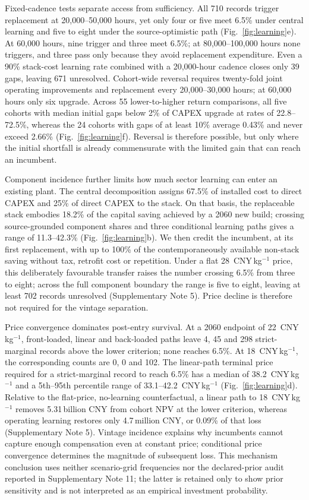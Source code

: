 \documentclass[11pt,a4paper]{article}
\newcommand{\cnykg}{CNY\,kg$^{-1}$}
\begin{document}
Fixed-cadence tests separate access from sufficiency. All 710 records trigger replacement at 20,000--50,000 hours, yet only four or five meet 6.5\% under central learning and five to eight under the source-optimistic path (Fig.~\ref{fig:learning}e). At 60,000 hours, nine trigger and three meet 6.5\%; at 80,000--100,000 hours none triggers, and three pass only because they avoid replacement expenditure. Even a 90\% stack-cost learning rate combined with a 20,000-hour cadence closes only 39 gaps, leaving 671 unresolved. Cohort-wide reversal requires twenty-fold joint operating improvements and replacement every 20,000--30,000 hours; at 60,000 hours only six upgrade. Across 55 lower-to-higher return comparisons, all five cohorts with median initial gaps below 2\% of CAPEX upgrade at rates of 22.8--72.5\%, whereas the 24 cohorts with gaps of at least 10\% average 0.43\% and never exceed 2.66\% (Fig.~\ref{fig:learning}f). Reversal is therefore possible, but only where the initial shortfall is already commensurate with the limited gain that can reach an incumbent.

Component incidence further limits how much sector learning can enter an existing plant. The central decomposition assigns 67.5\% of installed cost to direct CAPEX and 25\% of direct CAPEX to the stack. On that basis, the replaceable stack embodies 18.2\% of the capital saving achieved by a 2060 new build; crossing source-grounded component shares and three conditional learning paths gives a range of 11.3--42.3\% (Fig.~\ref{fig:learning}b). We then credit the incumbent, at its first replacement, with up to 100\% of the contemporaneously available non-stack saving without tax, retrofit cost or repetition. Under a flat 28~\cnykg{} price, this deliberately favourable transfer raises the number crossing 6.5\% from three to eight; across the full component boundary the range is five to eight, leaving at least 702 records unresolved (Supplementary Note 5). Price decline is therefore not required for the vintage separation.

Price convergence dominates post-entry survival. At a 2060 endpoint of 22~\cnykg{}, front-loaded, linear and back-loaded paths leave 4, 45 and 298 strict-marginal records above the lower criterion; none reaches 6.5\%. At 18~\cnykg{}, the corresponding counts are 0, 0 and 102. The linear-path terminal price required for a strict-marginal record to reach 6.5\% has a median of 38.2~\cnykg{} and a 5th--95th percentile range of 33.1--42.2~\cnykg{} (Fig.~\ref{fig:learning}d). Relative to the flat-price, no-learning counterfactual, a linear path to 18~\cnykg{} removes 5.31\,billion CNY from cohort NPV at the lower criterion, whereas operating learning restores only 4.7\,million CNY, or 0.09\% of that loss (Supplementary Note 5). Vintage incidence explains why incumbents cannot capture enough compensation even at constant price; conditional price convergence determines the magnitude of subsequent loss. This mechanism conclusion uses neither scenario-grid frequencies nor the declared-prior audit reported in Supplementary Note 11; the latter is retained only to show prior sensitivity and is not interpreted as an empirical investment probability.
\end{document}
